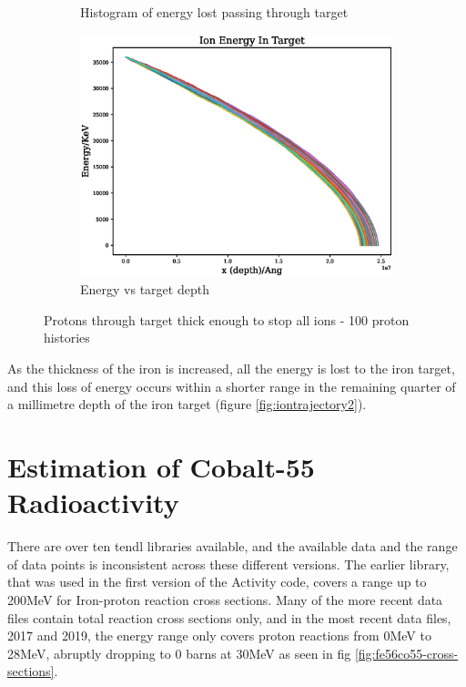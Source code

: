 \begin{figure}[htb]
\begin{subfigure}{0.49\textwidth}
  \caption{Histogram of energy lost passing through target}
  \label{fig:energylost2}
\end{subfigure}
\begin{subfigure}{0.49\textwidth}
  \includegraphics[width=\linewidth]{chapters/activity_code/images/energy_depth_full.eps}
  \caption{Energy vs target depth}
  \label{fig:fe36mevenergydepthfull}
\end{subfigure}
\caption{Protons through target thick enough to stop all ions - 100 proton histories}
\label{fig:xsdata-particle2}
\end{figure}

As the thickness of the iron is increased, all the energy is lost to the iron target, and this loss of energy occurs within a shorter range in the remaining quarter of a millimetre depth of the iron target (figure \ref{fig:iontrajectory2}).


\FloatBarrier
\section{Estimation of Cobalt-55 Radioactivity}

There are over ten \acrshort{tendl} libraries available, and the available data and the range of data points is inconsistent across these different versions.  The earlier library, that was used in the first version of the Activity code, covers a range up to 200MeV for Iron-proton reaction cross sections.  Many of the more recent data files contain total reaction cross sections only, and in the most recent data files, 2017 and 2019, the energy range only covers proton reactions from 0MeV to 28MeV, abruptly dropping to 0 barns at 30MeV as seen in fig \ref{fig:fe56co55-cross-sections}.

